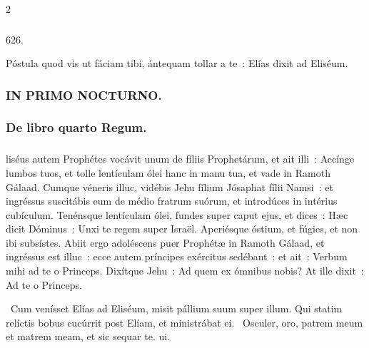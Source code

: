 \documentclass[9pt,twoside]{extarticle}
\begin{document}
\begin{multicols}{2}
{\subsubsection*{\center {}}

\begin{tightlist}{}
\item {} 626. 
\item {} Póstula quod vis ut fáciam tibi, ántequam tollar a te~: Elías dixit ad Eliséum. 
\item {}
\item {}
\end{tightlist}

\subsubsection*{\center \textsc{IN PRIMO NOCTURNO.}}
\subsubsection*{\center De libro quarto Regum.}
\subsubsection*{\center {}}
liséus autem Prophétes vocávit unum de fíliis Prophetárum, et ait illi~: Accínge lumbos tuos, et tolle lentículam ólei hanc in manu tua, et vade in Ramoth Gálaad.
Cumque véneris illuc, vidébis Jehu fílium Jósaphat fílii Namsi~: et ingréssus suscitábis eum de médio fratrum suórum, et introdúces in intérius cubículum.
Tenénsque lentículam ólei, fundes super caput ejus, et dices~: Hæc dicit Dóminus~: Unxi te regem super Israël. Aperiésque óstium, et fúgies, et non ibi subsístes.
Abiit ergo adoléscens puer Prophétæ in Ramoth Gálaad,
et ingréssus est illuc~: ecce autem príncipes exércitus sedébant~: et ait~: Verbum mihi ad te o Princeps. Dixítque Jehu~: Ad quem ex ómnibus nobis? At ille dixit~: Ad te o Princeps.

\begin{tightlist}{}
\item {}~Cum venísset Elías ad Eliséum, misit pállium suum super illum. \textred{*} Qui statim relíctis bobus cucúrrit post Elíam, et ministrábat ei. ~Osculer, oro, patrem meum et matrem meam, et sic sequar te. ui.
\end{tightlist}

}
\end{multicols}
\end{document}
